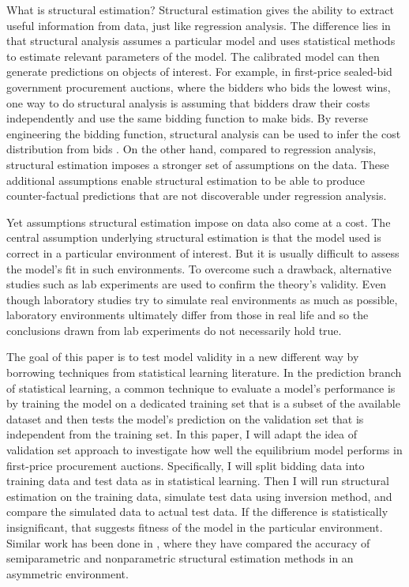 \documentclass[11pt]{article}
\begin{document}
What is structural estimation? 
Structural estimation gives the ability to extract useful information from 
data, just like regression analysis. The difference lies in that structural 
analysis assumes a particular model and uses statistical methods to 
estimate relevant parameters of the model. The calibrated model can then 
generate predictions on objects of interest. For example, 
in first-price sealed-bid government procurement auctions, where 
the bidders who bids the lowest wins,
one way to do structural analysis is assuming that bidders draw their costs 
independently and use the same bidding function to make bids. 
By reverse engineering the bidding function, structural analysis 
can be used to infer the cost distribution from bids \cite{Guerreetal2000}. 
On the other hand, compared to regression analysis, 
structural estimation imposes a stronger set of 
assumptions on the data. These additional assumptions enable 
structural estimation to be able to produce 
counter-factual predictions that are not discoverable under 
regression analysis. 

Yet assumptions structural estimation impose on data also come at a cost.
The central assumption underlying structural estimation is that the model used 
is correct in a particular environment of interest. 
But it is usually difficult to assess the model's fit in such environments. 
To overcome such a drawback, alternative 
studies such as lab experiments are used to confirm the theory's validity. 
Even though laboratory studies try to simulate real environments as much 
as possible, laboratory environments ultimately differ from those in real life 
and so the conclusions drawn from lab experiments do not necessarily hold true.

The goal of this paper is to test model validity in a new different way by 
borrowing techniques from statistical learning literature. In the 
prediction branch of statistical learning, a common 
technique to evaluate a model's performance is by training the model 
on a dedicated training set that is a subset of the available dataset and then 
tests the model's prediction on the validation set that is independent from the 
training set.  
In this paper, I will adapt the idea 
of validation set approach to investigate how well the equilibrium model 
performs in first-price procurement auctions. Specifically, I will 
split bidding data into training data and test data as in statistical learning.
Then I will 
run structural estimation on the training data, simulate test data using 
inversion method, and compare the simulated data to actual 
test data. If the difference is statistically insignificant, that suggests 
fitness of the model in the particular environment. 
Similar work has been done in \citeauthor{ChernomazYushioto2019} 
\citeyear{ChernomazYushioto2019}, where they have compared the accuracy 
of semiparametric and nonparametric structural estimation methods in an 
asymmetric environment.  
\end{document}
